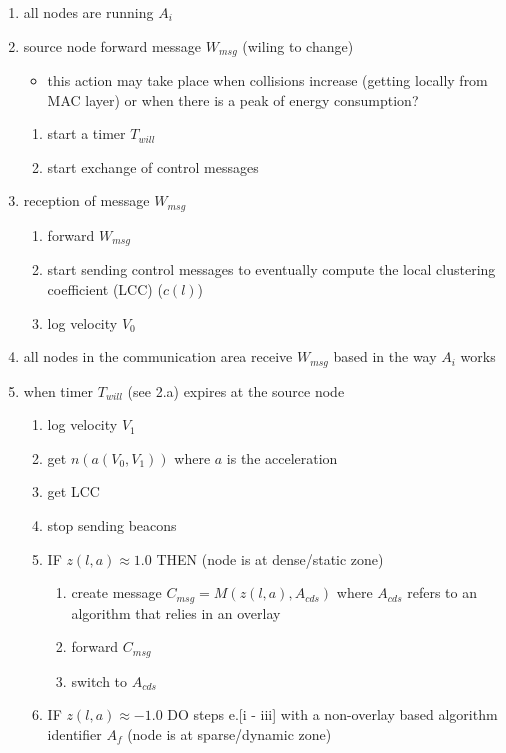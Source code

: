 \begin{enumerate}

\item all nodes are running $A_{i}$

\item source node forward message $W_{msg}$ (wiling to change)
	\begin{itemize}
	\item this action may take place when collisions increase (getting locally from MAC layer) or when there is a peak of energy consumption?
	\end{itemize}
	\begin{enumerate}
		\item start a timer $T_{will}$
		\item start exchange of control messages
	\end{enumerate}

\item reception of message $W_{msg}$
	\begin{enumerate}
		\item forward $W_{msg}$
		\item start sending control messages to eventually compute the local clustering coefficient (LCC) ($c(l)$)
		\item log velocity $V_{0}$
	\end{enumerate}

\item all nodes in the communication area receive $W_{msg}$ based in the way $A_{i}$ works

\item when timer $T_{will}$ (see 2.a) expires at the source node
	\begin{enumerate}
		\item log velocity $V_{1}$
		\item get $n(a(V_{0}, V_{1}))$ where $a$ is the acceleration
		\item get LCC
		\item stop sending beacons
		\item IF $z(l, a) \approx 1.0$ THEN (node is at dense/static zone)
		\begin{enumerate}
			\item create message $C_{msg}=M(z(l, a), A_{cds})$ where $A_{cds}$ refers to an algorithm that relies in an overlay
			\item forward $C_{msg}$
			\item switch to $A_{cds}$
		\end{enumerate}
		\item IF $z(l, a) \approx -1.0$ DO steps e.[i - iii] with a non-overlay based algorithm identifier $A_{f}$ (node is at sparse/dynamic zone)
	\end{enumerate}


\end{enumerate}
